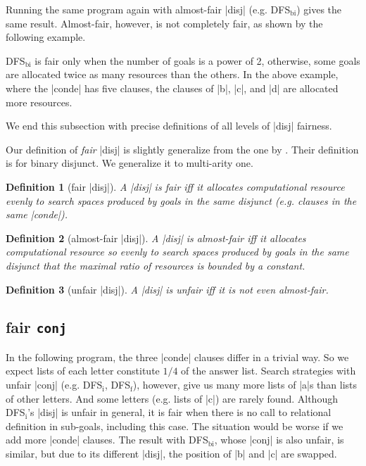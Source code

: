 \documentclass[format=acmlarge, review=true, authordraft=true]{acmart}
\newtheorem{defn}{Definition}[section]
\begin{document}
Running the same program again with almost-fair \scheme|disj| 
(e.g. DFS$_\textrm{bi}$) gives the same result. Almost-fair, however, is not 
completely fair, as shown by the following example. 

\begin{center}
    \begin{schemeregion}
    \end{schemeregion}
\end{center}

DFS$_\textrm{bi}$ is fair only when the number of goals is a power of 2, 
otherwise, some goals are allocated twice as many resources than the others. In 
the above example, where the \scheme|conde| has five clauses, the clauses of 
\scheme|b|, \scheme|c|, and \scheme|d| are allocated more resources.

We end this subsection with precise definitions of all levels of 
\scheme|disj| fairness.

Our definition of \emph{fair} \scheme|disj| is slightly generalize from the one 
by \citet{seres1999algebra}. Their definition is for binary disjunct. We 
generalize it to multi-arity one.

\begin{defn}[fair \scheme|disj|]
A \scheme|disj| is fair iff it allocates computational resource evenly to 
search spaces produced by goals in the same disjunct (e.g. clauses in the 
same 
\scheme|conde|).
\end{defn}

\begin{defn}[almost-fair \scheme|disj|]
A \scheme|disj| is almost-fair iff it allocates computational resource so 
evenly to search spaces produced by goals in the same disjunct that the maximal 
ratio of resources is bounded by a constant.
\end{defn}

\begin{defn}[unfair \scheme|disj|]
A \scheme|disj| is unfair iff it is not even almost-fair.
\end{defn}


\subsection{fair \texttt{conj}}

In the following program, the three \scheme|conde| clauses differ in a trivial way. So 
we expect lists of each letter constitute $1/4$ of the answer list. Search 
strategies with unfair \scheme|conj| (e.g. DFS$_\textrm{i}$, DFS$_\textrm{f}$), 
however, give us many more lists of \scheme|a|s than lists of other letters. 
And some letters (e.g. lists 
of \scheme|c|) are rarely found. Although DFS$_\textrm{i}$'s \scheme|disj| is unfair in general, 
it is fair when there is no call to relational definition in sub-goals, 
including this case. The situation would be worse if we add more \scheme|conde| 
clauses. The result with DFS$_\textrm{bi}$, whose \scheme|conj| is also unfair, is similar, but 
due to its different \scheme|disj|, the position of \scheme|b| and \scheme|c| are 
swapped. 
\end{document}
